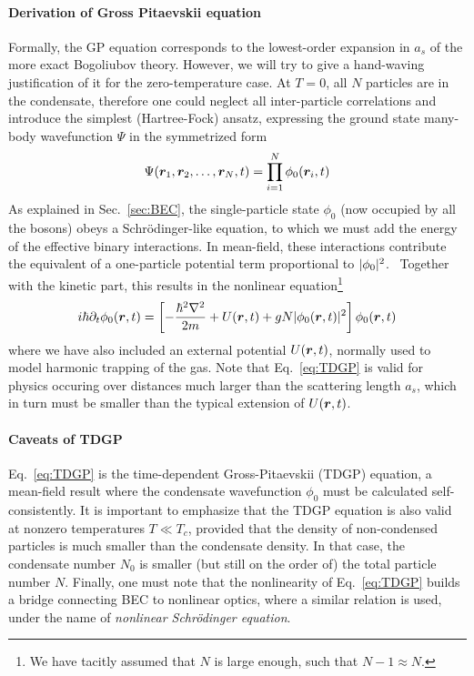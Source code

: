 \paragraph{Derivation of Gross Pitaevskii equation}
Formally, the GP equation corresponds to the lowest-order expansion in
$a_s$ of the more exact Bogoliubov theory. However, we will try to
give a hand-waving justification of it for the zero-temperature
case. At $T=0$, all $N$ particles are in the condensate, therefore one
could neglect all inter-particle correlations and introduce the
simplest (Hartree-Fock) ansatz, expressing the ground state many-body
wavefunction $\Psi$ in the symmetrized form
%
\begin{equation}\label{eq:HF-ansatz}
  \Psi(\bm{r}_1,\bm{r}_2,\dots,\bm{r}_N,t) = \prod_{i = 1}^{N} \phi_0(\bm{r}_i,t)
\end{equation}
% 
As explained in Sec.~\ref{sec:BEC}, the single-particle state $\phi_0$
(now occupied by all the bosons) obeys a Schr\"{o}dinger-like
equation, to which we must add the energy of the effective binary
interactions. In mean-field, these interactions contribute the
equivalent of a one-particle potential term proportional to
$\vert \phi_0 \vert^2$.~\cite{Leggett_1999} Together with the kinetic part,
this results in the nonlinear equation\footnote{We have tacitly
  assumed that $N$ is large enough, such that $N-1 \approx N$.}
%
\begin{equation}\label{eq:TDGP}
  i\hbar\partial_t\phi_0(\bm{r},t) = 
  \left[-\frac{\hbar^2\nabla^2}{2m} + U(\bm{r},t) + g N |\phi_0(\bm{r},t)|^2\right]\phi_0(\bm{r},t)
\end{equation}
% 
where we have also included an external potential $U(\bm{r},t)$, normally
used to model harmonic trapping of the gas. Note that
Eq.~\eqref{eq:TDGP} is valid for physics occuring over distances much
larger than the scattering length $a_s$, which in turn must be smaller
than the typical extension of $U(\bm{r},t)$.

\paragraph{Caveats of TDGP}
Eq.~\eqref{eq:TDGP} is the time-dependent Gross-Pitaevskii (TDGP)
equation, a mean-field result where the condensate wavefunction
$\phi_0$ must be calculated self-consistently. It is important to
emphasize that the TDGP equation is also valid at nonzero temperatures
$T \ll T_c$, provided that the density of non-condensed particles is
much smaller than the condensate density. In that case, the condensate
number $N_0$ is smaller (but still on the order of) the total particle
number $N$. Finally, one must note that the nonlinearity of
Eq.~\eqref{eq:TDGP} builds a bridge connecting BEC to nonlinear
optics, where a similar relation is used, under the name of
\textit{nonlinear Schr\"{o}dinger equation}.

